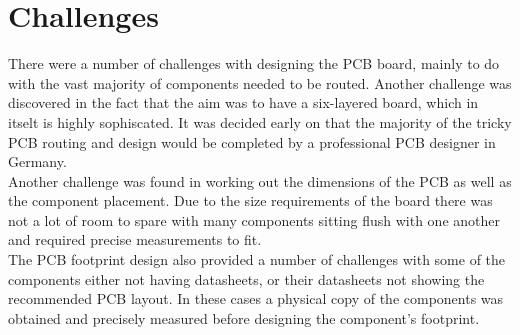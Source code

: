 \section{Challenges}

	There were a number of challenges with designing the PCB board, mainly to do with the vast majority of components needed to be routed. Another challenge was discovered in the fact that the aim was to have a six-layered board, which in itselt is highly sophiscated. It was decided early on that the majority of the tricky PCB routing and design would be completed by a professional PCB designer in Germany.\\
Another challenge was found in working out the dimensions of the PCB as well as the component placement. Due to the size requirements of the board there was not a lot of room to spare with many components sitting flush with one another and required precise measurements to fit. \\
The PCB footprint design also provided a number of challenges with some of the components either not having datasheets, or their datasheets not showing the recommended PCB layout. In these cases a physical copy of the components was obtained and precisely measured before designing the component's footprint.











